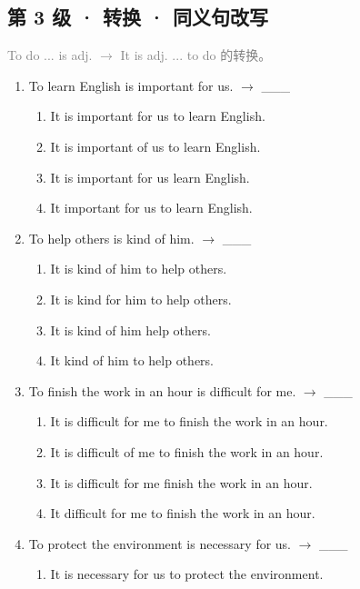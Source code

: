 \documentclass[11pt,a4paper]{ctexart}
\begin{document}
\subsection*{第 3 级 · 转换 · 同义句改写}
\noindent\textcolor{gray}{To do ... is adj. $\rightarrow$ It is adj. ... to do 的转换。}\par\smallskip
\begin{enumerate}[leftmargin=*,itemsep=4pt]
\item To learn English is important for us. $\rightarrow$ \_\_\_
\begin{enumerate}[label=\Alph*.,leftmargin=2em,itemsep=1pt,topsep=2pt]
\item It is important for us to learn English.
\item It is important of us to learn English.
\item It is important for us learn English.
\item It important for us to learn English.
\end{enumerate}
\item To help others is kind of him. $\rightarrow$ \_\_\_
\begin{enumerate}[label=\Alph*.,leftmargin=2em,itemsep=1pt,topsep=2pt]
\item It is kind of him to help others.
\item It is kind for him to help others.
\item It is kind of him help others.
\item It kind of him to help others.
\end{enumerate}
\item To finish the work in an hour is difficult for me. $\rightarrow$ \_\_\_
\begin{enumerate}[label=\Alph*.,leftmargin=2em,itemsep=1pt,topsep=2pt]
\item It is difficult for me to finish the work in an hour.
\item It is difficult of me to finish the work in an hour.
\item It is difficult for me finish the work in an hour.
\item It difficult for me to finish the work in an hour.
\end{enumerate}
\item To protect the environment is necessary for us. $\rightarrow$ \_\_\_
\begin{enumerate}[label=\Alph*.,leftmargin=2em,itemsep=1pt,topsep=2pt]
\item It is necessary for us to protect the environment.

\end{enumerate}
\end{enumerate}
\end{document}
